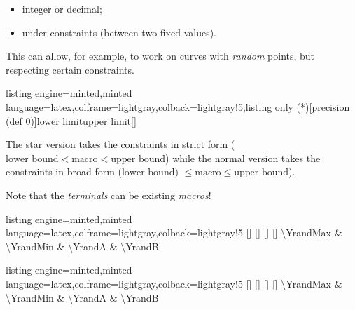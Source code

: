 \documentclass[11pt,a4paper]{ltxdoc}
\begin{document}
\begin{itemize}
	\item integer or decimal;
	\item under constraints (between two fixed values).
\end{itemize}

This can allow, for example, to work on curves with \textit{random} points, but respecting certain constraints.

\begin{tcblisting}{listing engine=minted,minted language=latex,colframe=lightgray,colback=lightgray!5,listing only}
\PickRandomNb(*)[precision (def 0)]{lower limit}{upper limit}[\macro]
\end{tcblisting}

The star version takes the constraints in strict form ($\text{lower bound} < \text{macro} < \text{upper bound}$) while the normal version takes the constraints in broad form ($\text{lower bound) } \leq \text{macro} \leq \text{upper bound}$).

\smallskip

Note that the \textit{terminals} can be existing \textit{macros}!

\begin{tcblisting}{listing engine=minted,minted language=latex,colframe=lightgray,colback=lightgray!5}
[\YrandMax]%
[\YrandMin]%
[\YrandA]%
[\YrandB]%
\num{\YrandMax} \& \num{\YrandMin} \& \num{\YrandA} \& \num{\YrandB}
\end{tcblisting}

\begin{tcblisting}{listing engine=minted,minted language=latex,colframe=lightgray,colback=lightgray!5}
[\YrandMax]%
[\YrandMin]%
[\YrandA]%
[\YrandB]%
\num{\YrandMax} \& \num{\YrandMin} \& \num{\YrandA} \& \num{\YrandB}
\end{tcblisting}
\end{document}
